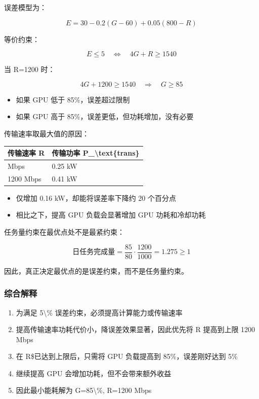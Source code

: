 \documentclass[
]{article}
\begin{document}
误差模型为：

\[E = 30 - 0.2(G - 60) + 0.05(800 - R)\]

等价约束：

\[E \le 5 \quad \Longleftrightarrow \quad 4G + R \ge 1540\]

当 R=1200 时：

\[4G + 1200 \ge 1540 \quad \Rightarrow \quad G \ge 85\]

\begin{itemize}
\item
  如果 GPU 低于 85\%，误差超过限制
\item
  如果 GPU 高于 85\%，误差更低，但功耗增加，没有必要
\end{itemize}

传输速率取最大值的原因：

\begin{longtable}[]{@{}ll@{}}
\toprule\noalign{}
传输速率 R & 传输功率 P\_\textbackslash text\{trans\} \\
\midrule\noalign{}
\endhead
\bottomrule\noalign{}
\endlastfoot
800 Mbps & 0.25 kW \\
1200 Mbps & 0.41 kW \\
\end{longtable}

\begin{itemize}
\item
  仅增加 0.16 kW，却能将误差率下降约 20 个百分点
\item
  相比之下，提高 GPU 负载会显著增加 GPU 功耗和冷却功耗
\end{itemize}

任务量约束在最优点处不是最紧约束：

\[\text{日任务完成量} = \frac{85}{80} \cdot \frac{1200}{1000} = 1.275 \ge 1\]

因此，真正决定最优点的是误差约束，而不是任务量约束。

\subsubsection{综合解释}\label{ux7efcux5408ux89e3ux91ca}

\begin{enumerate}
\def\labelenumi{\arabic{enumi}.}
\item
  为满足 5\textbackslash\% 误差约束，必须提高计算能力或传输速率
\item
  提高传输速率功耗代价小，降误差效果显著，因此优先将 R 提高到上限 1200
  Mbps
\item
  在 R\$已达到上限后，只需将 GPU 负载提高到 85\%，误差刚好达到 5\%
\item
  继续提高 GPU 会增加功耗，但不会带来额外收益
\item
  因此最小能耗解为 G=85\textbackslash\%, R=1200 Mbps
\end{enumerate}
\end{document}
